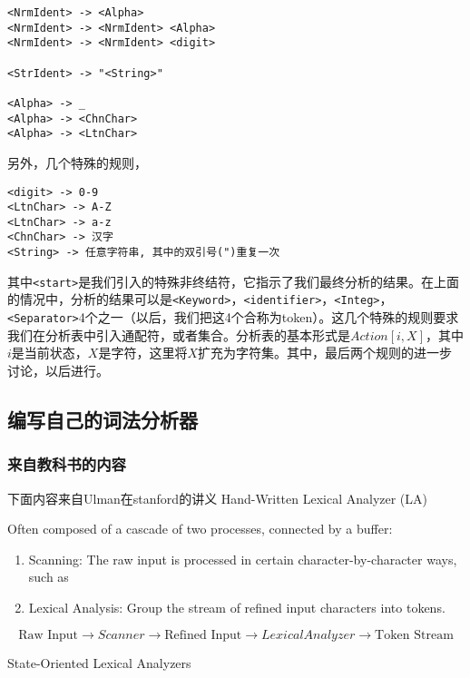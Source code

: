 \documentclass{article}
\begin{document}
\begin{CJK}{UTF8}{gbsn}
\begin{verbatim}
<NrmIdent> -> <Alpha>
<NrmIdent> -> <NrmIdent> <Alpha>
<NrmIdent> -> <NrmIdent> <digit>

<StrIdent> -> "<String>"

<Alpha> -> _
<Alpha> -> <ChnChar>
<Alpha> -> <LtnChar>
\end{verbatim}
  
另外，几个特殊的规则，
\begin{verbatim}
<digit> -> 0-9
<LtnChar> -> A-Z
<LtnChar> -> a-z
<ChnChar> -> 汉字
<String> -> 任意字符串, 其中的双引号(")重复一次
\end{verbatim}

其中\verb|<start>|是我们引入的特殊非终结符，它指示了我们最终分析的结果。在上面的情况中，分析的结果可以是\verb|<Keyword>|，\verb|<identifier>|，\verb|<Integ>|，\verb|<Separator>|4个之一（以后，我们把这4个合称为token）。这几个特殊的规则要求我们在分析表中引入通配符，或者集合。分析表的基本形式是$Action[i,X]$，其中$i$是当前状态，$X$是字符，这里将$X$扩充为字符集。其中，最后两个规则的进一步讨论，以后进行。

\subsection{编写自己的词法分析器} \label{sec:ownla}

\subsubsection{来自教科书的内容}

下面内容来自Ulman在stanford的讲义
Hand-Written Lexical Analyzer (LA)

Often composed of a cascade of two processes, connected by a buffer:
\begin{enumerate}
\item Scanning: The raw input is processed in certain character-by-character ways, such as
\item Lexical Analysis: Group the stream of refined input characters into tokens.
\end{enumerate}
\[
\text{Raw Input} \to Scanner \to \text{Refined Input} \to LexicalAnalyzer \to \text{Token Stream}
\]

State-Oriented Lexical Analyzers


\end{CJK}
\end{document}
